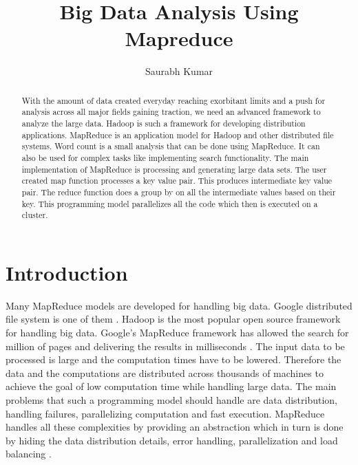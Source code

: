 \documentclass[sigconf]{acmart}
\begin{document}
\title{Big Data Analysis Using Mapreduce}


\author{Saurabh Kumar}

\renewcommand{\shortauthors}{B. Trovato et al.}


\begin{abstract}
With the amount of data created everyday reaching exorbitant limits and a push for analysis across all major fields gaining traction, we need an advanced framework to analyze the large data. Hadoop is such a framework for developing distribution applications. MapReduce is an application model for Hadoop and other distributed file systems. Word count is a small analysis that can be done using MapReduce. It can also be used for complex tasks like implementing search functionality. The main implementation of MapReduce is processing and generating large data sets. The user created map function processes a key value pair. This produces intermediate key value pair. The reduce function does a group by on all the intermediate values based on their key. This programming model parallelizes all the code which then is executed on a cluster.
\end{abstract}



\maketitle

\section{Introduction}

Many MapReduce models are developed for handling big data. Google distributed file system is one of them \cite{rf1}. Hadoop is the most popular open source framework for handling big data. Google's MapReduce framework has allowed the search for million of pages and delivering the results in milliseconds \cite{rf2}. The input data to be processed is large and the computation times have to be lowered. Therefore the data and the computations are distributed across thousands of machines to achieve the goal of low computation time while handling large data. The main problems that such a programming model should handle are data distribution, handling failures, parallelizing computation and fast execution. MapReduce handles all these complexities by providing an abstraction which in turn is done by hiding the data distribution details, error handling, parallelization and load balancing \cite{rf3}. 
\end{document}
